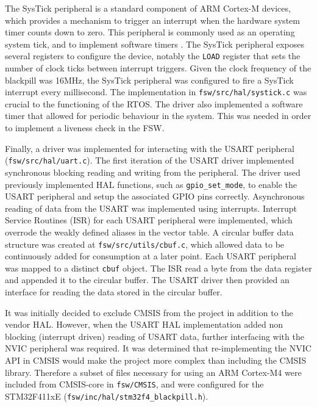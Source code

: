 \documentclass[../report.tex]{subfiles}
\begin{document}
The SysTick peripheral is a standard component of ARM Cortex-M devices, which
provides a mechanism to trigger an interrupt when the hardware system timer
counts down to zero. This peripheral is commonly used as an operating system
tick, and to implement software timers \citep{armcm4_manual}. The SysTick
peripheral exposes several registers to configure the device, notably the
\lstinline|LOAD| register that sets the number of clock ticks between interrupt
triggers. Given the clock frequency of the blackpill was 16MHz, the SysTick
peripheral was configured to fire a SysTick interrupt every millisecond. The
implementation in \lstinline|fsw/src/hal/systick.c| was crucial to
the functioning of the RTOS. The driver also implemented a software timer that
allowed for periodic behaviour in the system. This was needed in order to
implement a liveness check in the FSW.

Finally, a driver was implemented for interacting with the USART peripheral
(\lstinline|fsw/src/hal/uart.c|). The first iteration of the USART
driver implemented synchronous blocking reading and writing from the
peripheral. The driver used previously implemented HAL functions, such as
\lstinline|gpio_set_mode|, to enable the USART peripheral and setup the
associated GPIO pins correctly.
Asynchronous reading of data from the USART was implemented using interrupts.
Interrupt Service Routines (ISR) for each USART peripheral were implemented,
which overrode the weakly defined aliases in the vector table. A circular
buffer data structure was created at \lstinline|fsw/src/utils/cbuf.c|, which
allowed data to be continuously added for consumption at a later point. Each
USART peripheral was mapped to a distinct \lstinline|cbuf| object. The ISR read
a byte from the data register and appended it to the circular buffer. The
USART driver then provided an interface for reading the data stored in the
circular buffer.

It was initially decided to exclude CMSIS from the project in addition to the
vendor HAL. However, when the USART HAL implementation added non blocking
(interrupt driven) reading of USART data, further interfacing with the NVIC
peripheral was required. It was determined that re-implementing the NVIC API in
CMSIS would make the project more complex than including the CMSIS library.
Therefore a subset of files necessary for using an ARM Cortex-M4 were included
from CMSIS-core \citep{CMSIS} in \lstinline|fsw/CMSIS|, and were configured for
the STM32F411xE (\lstinline|fsw/inc/hal/stm32f4_blackpill.h|).
\end{document}
